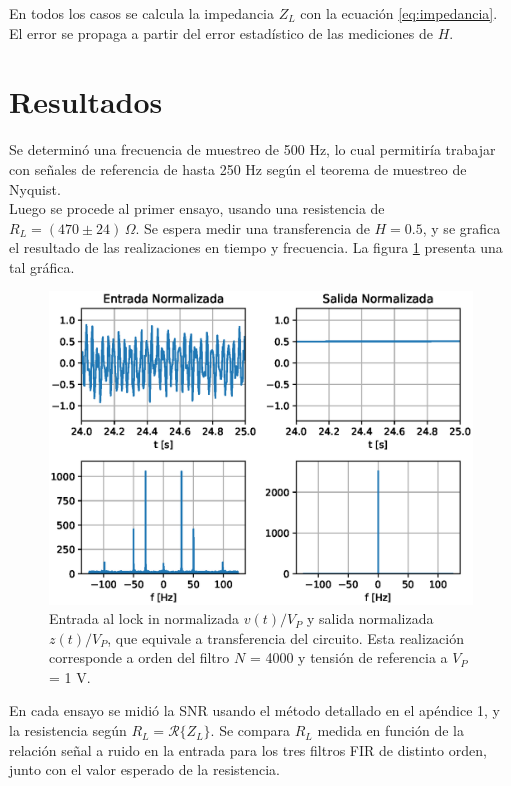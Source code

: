 \documentclass[11pt,a4paper]{extarticle}
\begin{document}
\begin{multicols}{2}
En todos los casos se calcula la impedancia $Z_L$ con la ecuación \ref{eq:impedancia}. El error se propaga a partir del error estadístico de las mediciones de $H$.

\section{Resultados}

Se determinó una frecuencia de muestreo de 500 Hz, lo cual permitiría trabajar con señales de referencia de hasta 250 Hz 
según el teorema de muestreo de Nyquist.\\

Luego se procede al primer ensayo, usando una resistencia de $R_L = (470 \pm 24)\,\Omega$.
Se espera medir una transferencia de $H = 0.5$, y se grafica el resultado de las realizaciones en tiempo y frecuencia. La figura \ref{fig:in_out} presenta una tal gráfica.\\

\begin{figure}[H]
	\centering
	\includegraphics[width=\linewidth]{Images/in_out.eps}
	\caption{Entrada al lock in normalizada $v(t)/V_P$ y salida normalizada $z(t)/V_P$, 
	que equivale a transferencia del circuito. Esta realización corresponde a orden del filtro $N$ = 4000 y tensión de referencia a $V_P$ = 1 V.}
	\label{fig:in_out}
\end{figure}

En cada ensayo se midió la SNR usando el método detallado en el apéndice 1, y la resistencia según $R_L = \mathcal{R}\{Z_L\}$.
Se compara $R_L$ medida en función de la relación señal a ruido en la entrada para los tres 
filtros FIR de distinto orden, junto con el valor esperado de la resistencia.\\


\end{multicols}
\end{document}
